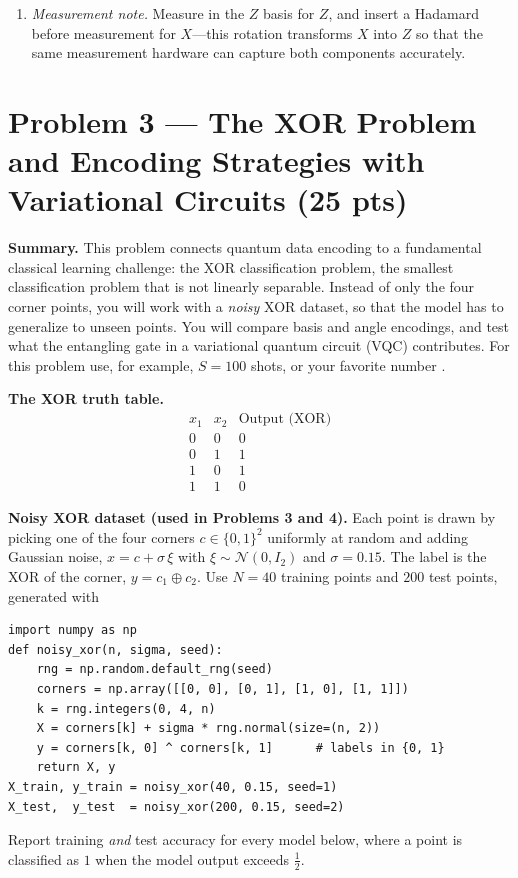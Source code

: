 \documentclass[11pt]{article}
\newenvironment{summary}{\par\noindent\textbf{Summary.} }{\par}
\begin{document}
\begin{enumerate}[label=(\alph*)]
\begin{enumerate}[label=(\roman*)]
Report: (1) the optimized parameter \({\hat\theta}\), (2) the achieved value \({E(\hat\theta)}\), and (3) whether \({\hat\theta}\) (modulo \({2\pi}\) and global phase) matches your analytic \({\theta_\star}\).
  \item \emph{Measurement note.} Measure in the $Z$ basis for $Z$, and insert a Hadamard before measurement for $X$—this rotation transforms $X$ into $Z$ so that the same measurement hardware can capture both components accurately.
\end{enumerate}
\end{enumerate}

\section*{Problem 3 — The XOR Problem and Encoding Strategies with Variational Circuits (25 pts)}

\begin{summary}
This problem connects quantum data encoding to a fundamental classical learning challenge: the XOR classification problem, the smallest classification problem that is not linearly separable. Instead of only the four corner points, you will work with a \emph{noisy} XOR dataset, so that the model has to generalize to unseen points. You will compare basis and angle encodings, and test what the entangling gate in a variational quantum circuit (VQC) contributes. For this problem use, for example, $S=100$ shots, or your favorite number \smiley{}.
\end{summary}

\noindent\textbf{The XOR truth table.}
\[
\begin{array}{c|c|c}
x_1 & x_2 & \text{Output (XOR)} \\ \hline
0 & 0 & 0 \\ 0 & 1 & 1 \\ 1 & 0 & 1 \\ 1 & 1 & 0
\end{array}
\]

\noindent\textbf{Noisy XOR dataset (used in Problems 3 and 4).}
Each point is drawn by picking one of the four corners $c\in\{0,1\}^2$ uniformly at random and adding Gaussian noise, $x = c + \sigma\,\xi$ with $\xi\sim\mathcal{N}(0,I_2)$ and $\sigma=0.15$. The label is the XOR of the corner, $y = c_1 \oplus c_2$. Use $N=40$ training points and $200$ test points, generated with
\begin{verbatim}
import numpy as np
def noisy_xor(n, sigma, seed):
    rng = np.random.default_rng(seed)
    corners = np.array([[0, 0], [0, 1], [1, 0], [1, 1]])
    k = rng.integers(0, 4, n)
    X = corners[k] + sigma * rng.normal(size=(n, 2))
    y = corners[k, 0] ^ corners[k, 1]      # labels in {0, 1}
    return X, y
X_train, y_train = noisy_xor(40, 0.15, seed=1)
X_test,  y_test  = noisy_xor(200, 0.15, seed=2)
\end{verbatim}
Report training \emph{and} test accuracy for every model below, where a point is classified as $1$ when the model output exceeds $\tfrac12$.
\end{document}

